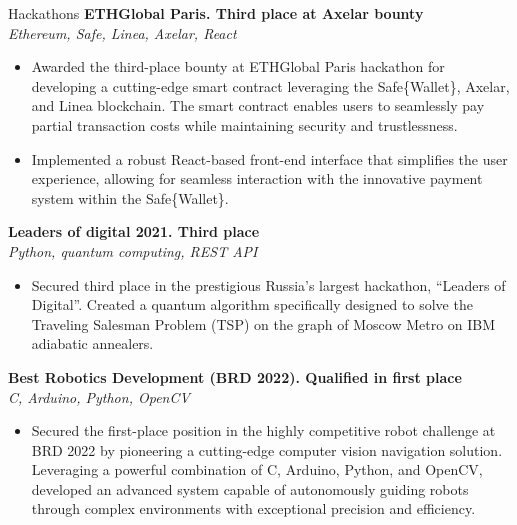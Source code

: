 \documentclass{resume} %
\begin{document}
\begin{rSection}{Hackathons}
{\bf ETHGlobal Paris. Third place at Axelar bounty}  \hfill {}
\\{\textit{Ethereum, Safe, Linea, Axelar, React }}
\begin{itemize}
    \item Awarded the third-place bounty at ETHGlobal Paris hackathon for developing a cutting-edge smart contract leveraging the Safe\{Wallet\}, Axelar, and Linea blockchain. The smart contract enables users to seamlessly pay partial transaction costs while maintaining security and trustlessness.
    \item Implemented a robust React-based front-end interface that simplifies the user experience, allowing for seamless interaction with the innovative payment system within the Safe\{Wallet\}.
\end{itemize}
{\bf Leaders of digital 2021. Third place}   \hfill {}
\\{\textit{Python, quantum computing, REST API}}
\begin{itemize}
    \item Secured third place in the prestigious Russia's largest hackathon, ``Leaders of Digital''. Created a quantum algorithm specifically designed to solve the Traveling Salesman Problem (TSP) on the graph of Moscow Metro on IBM adiabatic annealers.
\end{itemize}

{\bf Best Robotics Development (BRD 2022). Qualified in first place}  \hfill {}
\\{\textit{ C, Arduino, Python, OpenCV }}
\begin{itemize}
    \item Secured the first-place position in the highly competitive robot challenge at BRD 2022 by pioneering a cutting-edge computer vision navigation solution. Leveraging a powerful combination of C, Arduino, Python, and OpenCV, developed an advanced system capable of autonomously guiding robots through complex environments with exceptional precision and efficiency.
\end{itemize}


\end{rSection}
\end{document}
